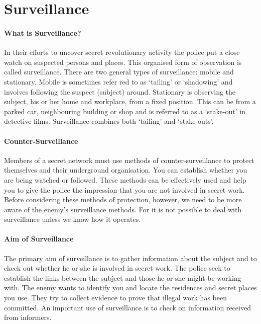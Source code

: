 \section{Surveillance}

\paragraph{ What is Surveillance?}

In their efforts to uncover secret revolutionary activity the police put
a close watch on suspected persons and places. This organised form of
observation is called surveillance. There are two general types of
surveillance: mobile and stationary. Mobile is sometimes refer red to as
`tailing' or `shadowing' and involves following the suspect (subject)
around. Stationary is observing the subject, his or her home and
workplace, from a fixed position. This can be from a parked car,
neighbouring building or shop and is referred to as a `stake-out' in
detective films. Surveillance combines both `tailing' and `stake-outs'.

\paragraph{Counter-Surveillance}

Members of a secret network must use methods of counter-surveillance to
protect themselves and their underground organisation. You can establish
whether you are being watched or followed. These methods can be
effectively used and help you to give the police the impression that you
are not involved in secret work. Before considering these methods of
protection, however, we need to be more aware of the enemy's
surveillance methods. For it is not possible to deal with surveillance
unless we know how it operates.

\paragraph{Aim of Surveillance}

The primary aim of surveillance is to gather information about the
subject and to check out whether he or she is involved in secret work.
The police seek to establish the links between the subject and those he
or she might be working with. The enemy wants to identify you and locate
the residences and secret places you use. They try to collect evidence
to prove that illegal work has been committed. An important use of
surveillance is to check on information received from informers.

